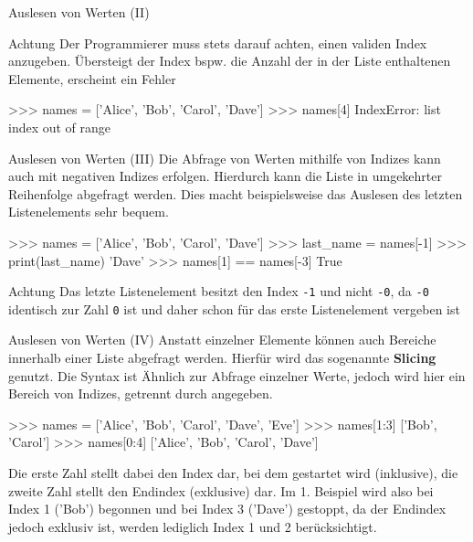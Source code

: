         \begin{frame}[fragile]{Auslesen von Werten (II)}
            \begin{alertblock}{Achtung}
                Der Programmierer muss stets darauf achten, einen validen Index anzugeben. Übersteigt der Index bspw. die Anzahl der in der Liste enthaltenen Elemente, erscheint ein Fehler

\begin{pyconcode}
>>> names = ['Alice', 'Bob', 'Carol', 'Dave']
>>> names[4]
IndexError: list index out of range
\end{pyconcode}  


            \end{alertblock}
        \end{frame}
        
        \begin{frame}[fragile]{Auslesen von Werten (III)}
            Die Abfrage von Werten mithilfe von Indizes kann auch mit negativen Indizes erfolgen. Hierdurch kann die Liste in umgekehrter Reihenfolge abgefragt werden. Dies macht beispielsweise das Auslesen des letzten Listenelements sehr bequem.

\begin{pyconcode}
>>> names = ['Alice', 'Bob', 'Carol', 'Dave']
>>> last_name = names[-1]
>>> print(last_name)
'Dave'
>>> names[1] == names[-3]
True
\end{pyconcode}  

        \begin{alertblock}{Achtung}
            Das letzte Listenelement besitzt den Index \texttt{-1} und nicht \texttt{-0}, da \texttt{-0} identisch zur Zahl \texttt{0} ist und daher schon für das erste Listenelement vergeben ist
        \end{alertblock}
        
        \end{frame}
        
        
        \begin{frame}[fragile]{Auslesen von Werten (IV)}
            Anstatt einzelner Elemente können auch Bereiche innerhalb einer Liste abgefragt werden. Hierfür wird das sogenannte \textbf{Slicing} genutzt. Die Syntax ist Ähnlich zur Abfrage einzelner Werte, jedoch wird hier ein Bereich von Indizes, getrennt durch \code{:} angegeben.
            
\begin{pyconcode}
>>> names = ['Alice', 'Bob', 'Carol', 'Dave', 'Eve']
>>> names[1:3]
['Bob', 'Carol']
>>> names[0:4]
['Alice', 'Bob', 'Carol', 'Dave']
\end{pyconcode}
        
        Die erste Zahl stellt dabei den Index dar, bei dem gestartet wird (inklusive), die zweite Zahl stellt den Endindex (exklusive) dar. Im 1. Beispiel wird also bei Index 1 ('Bob') begonnen und bei Index 3 ('Dave') gestoppt, da der Endindex jedoch exklusiv ist, werden lediglich Index 1 und 2 berücksichtigt.
        \end{frame}
        
